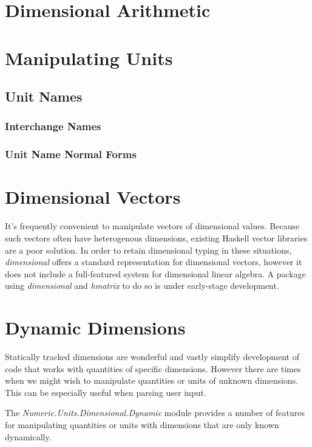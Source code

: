 \documentclass[11pt]{report}
\newcommand{\packagename}[1]{\textit{#1}}
\newcommand{\thispackage}{\packagename{dimensional}}
\newcommand{\modulename}[1]{\textit{#1}}
\newcommand{\submodule}[1]{\modulename{Numeric.Units.Dimensional.{#1}}}
\begin{document}
\chapter{Dimensional Arithmetic}

\chapter{Manipulating Units}

\section{Unit Names}

\subsection{Interchange Names}
\subsection{Unit Name Normal Forms}

\chapter{Dimensional Vectors}

It's frequently convenient to manipulate vectors of dimensional values. Because such vectors often have heterogenous
dimensions, existing Haskell vector libraries are a poor solution. In order to retain dimensional typing in these situations,
\thispackage{} offers a standard representation for dimensional vectors, however it does not include a full-featured system for
dimensional linear algebra. A package using \thispackage{} and \packagename{hmatrix} to do so is under early-stage development.



\chapter{Dynamic Dimensions}

Statically tracked dimensions are wonderful and vastly simplify development of code that works with quantities of specific
dimensions. However there are times when we might wish to manipulate quantities or units of unknown dimensions. This can be
especially useful when parsing user input.

The \submodule{Dynamic} module provides a number of features for manipulating quantities or units with dimensions that are only
known dynamically.
\end{document}
